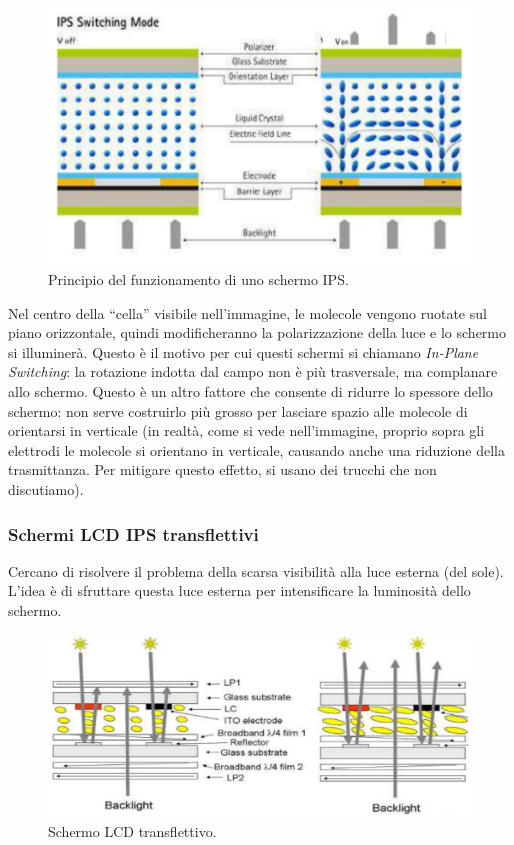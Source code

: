 \documentclass[a4paper,11pt]{article}
\begin{document}
\renewcommand{\thefigure}{4.8}
\begin{figure}[!h]
  \centering
    \includegraphics[scale=0.4]{images/4/ips_switching.png}
    \caption{Principio del funzionamento di uno schermo IPS.}
\end{figure}

Nel centro della ``cella'' visibile nell'immagine, le molecole vengono ruotate sul piano orizzontale, quindi modificheranno
la polarizzazione della luce e lo schermo si illuminerà. Questo è il motivo per cui questi schermi si chiamano
\textit{In-Plane Switching}: la rotazione indotta dal campo non è più trasversale, ma complanare allo schermo.
Questo è un altro fattore che consente di ridurre lo spessore dello schermo: non serve costruirlo più grosso per
lasciare spazio alle molecole di orientarsi in verticale (in realtà, come si vede nell'immagine, proprio sopra gli elettrodi le molecole si orientano in verticale,
causando anche una riduzione della trasmittanza. Per mitigare questo effetto, si usano dei trucchi che non discutiamo).

\subsubsection{Schermi LCD IPS transflettivi}
Cercano di risolvere il problema della scarsa visibilità alla luce esterna (del sole). L'idea è di sfruttare
questa luce esterna per intensificare la luminosità dello schermo.

\renewcommand{\thefigure}{4.9}
\begin{figure}[!h]
  \centering
    \includegraphics[scale=0.4]{images/4/transflective.png}
    \caption{Schermo LCD transflettivo.}
\end{figure}
\end{document}
